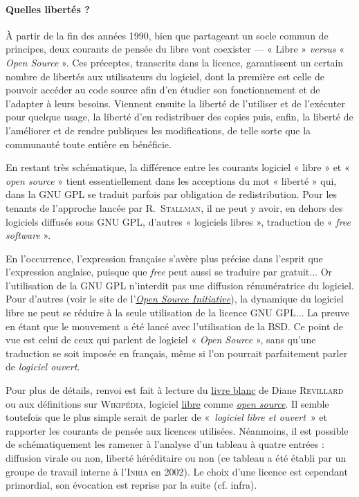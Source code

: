 \paragraph{Quelles libertés ?}
À partir de la fin des années 1990, bien que partageant un socle commun de principes, deux courants de pensée du libre vont coexister --- « Libre » \textit{versus} « \textit{Open Source} ». Ces préceptes, transcrits dans la licence, garantissent un certain nombre de libertés aux utilisateurs du logiciel, dont la première est celle de pouvoir accéder au code source afin d'en étudier son fonctionnement et de l'adapter à leurs besoins. Viennent ensuite la liberté de l'utiliser et de l'exécuter pour quelque usage, la liberté d'en redistribuer des copies puis, enfin, la liberté de l'améliorer et de rendre publiques les modifications, de telle sorte que la communauté toute entière en bénéficie.

En restant très schématique, la différence entre les courants logiciel « libre » et « \textit{open source} » tient essentiellement dans les acceptions du mot « liberté » qui, dans la GNU GPL se traduit parfois par obligation de redistribution. Pour les tenants de l'approche lancée par R.~\textsc{Stallman}, il ne peut y avoir, en dehors des logiciels diffusés sous GNU GPL, d'autres « logiciels libres », traduction de « \textit{free software} ».

En l'occurrence, l'expression française s'avère plus précise dans l'esprit que l'expression anglaise, puisque que \textit{free} peut aussi se traduire par gratuit... Or l'utilisation de la GNU GPL n'interdit pas une diffusion rému\-nératrice du logiciel. Pour d'autres (voir le site de l'\href{https://opensource.org/}{\textit{Open Source Initiative}}), la dynamique du logiciel libre ne peut se réduire à la seule utilisation de la licence GNU GPL... La preuve en étant que le mouvement a été lancé avec l'utilisation de la BSD. Ce point de vue est celui de ceux qui parlent de logiciel « \textit{Open Source} », sans qu'une traduction se soit imposée en français, même si l'on pourrait parfaitement parler de \emph{logiciel ouvert}.

Pour plus de détails, renvoi est fait à lecture du \href{http://drevillard.free.fr/texte_livreblanc.htm}{livre blanc} de Diane \textsc{Revillard} ou aux définitions sur \textsc{Wikipédia}, logiciel \href{https://fr.wikipedia.org/wiki/Logiciel_libre}{libre} comme \href{https://fr.wikipedia.org/wiki/Open_source}{\textit{open source}}. Il semble toutefois que le plus simple serait de parler de «~\emph{logiciel libre et ouvert}~» et rapporter les courants de pensée aux licences utilisées. Néanmoins, il est possible de schématiquement les ramener à l'analyse d'un tableau à quatre entrées : diffusion virale ou non, liberté héréditaire ou non (ce tableau a été établi par un groupe de travail interne à l'\textsc{Inria} en 2002). Le choix d'une licence est cependant primordial, son évocation est reprise par la suite (cf. infra).

